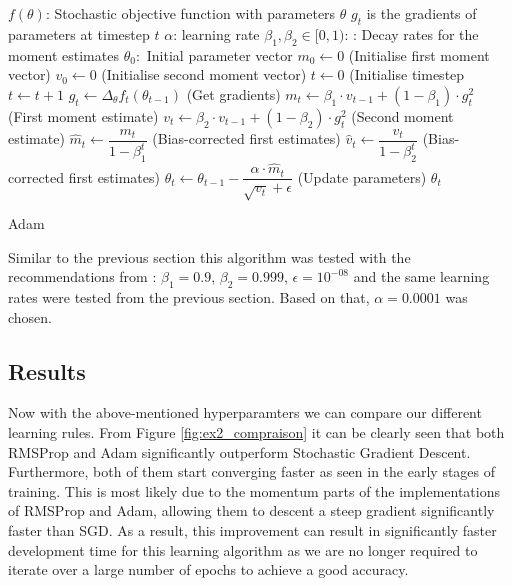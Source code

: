 \documentclass{article}
\begin{document}
\begin{algorithm}[ht]
\begin{algorithmic}
   \STATE $f(\theta)$: Stochastic objective function with parameters $\theta$ 
   \STATE $g_t$ is the gradients of parameters at timestep $t$
   \REQUIRE $\alpha$: learning rate
   \REQUIRE $\beta_1, \beta_2 \in [0,1)$: : Decay rates for the moment estimates
   \REQUIRE $\theta_0:$ Initial parameter vector
   \STATE $m_0 \gets 0$ (Initialise first moment vector)
   \STATE $v_0 \gets 0$ (Initialise second moment vector)
   \STATE $t \gets 0$ (Initialise timestep
   \STATE $t \gets t + 1$
   \STATE $g_t \gets \Delta_\theta f_t(\theta_{t-1})$ (Get gradients)
   \STATE $m_t \gets \beta_1 \cdot v_{t-1} + (1-\beta_1) \cdot g^2_t$ (First moment estimate)
   \STATE $v_t \gets \beta_2 \cdot v_{t-1} + (1-\beta_2) \cdot g^2_t$ (Second moment estimate)
   \STATE $\hat{m}_t \gets \dfrac{m_t}{1-\beta^t_1}$ (Bias-corrected first estimates)
   \STATE $\hat{v}_t \gets \dfrac{v_t}{1-\beta^t_2}$ (Bias-corrected first estimates)
   \STATE $\theta_t \gets \theta_{t-1} - \dfrac{\alpha \cdot \hat{m}_t}{\sqrt{v_t} + \epsilon}$ (Update parameters)
   \ENDWHILE
   \RETURN $\theta_t$
\end{algorithmic}
  \caption{Adam}
  \label{alg:adam}
\end{algorithm}

Similar to the previous section this algorithm was tested with the recommendations from \citep{Adam} : $\beta_1 = 0.9$, $\beta_2 = 0.999$, $\epsilon = 10^{-08}$ and the same learning rates were tested from the previous section. Based on that, $\alpha = 0.0001$ was chosen.

\subsection{Results}
Now with the above-mentioned hyperparamters we can compare our different learning rules. From Figure \ref{fig:ex2_compraison} it can be clearly seen that both RMSProp and Adam significantly outperform Stochastic Gradient Descent. Furthermore, both of them start converging faster as seen in the early stages of training. This is most likely due to the momentum parts of the implementations of RMSProp and Adam, allowing them to descent a steep gradient significantly faster than SGD. As a result, this improvement can result in significantly faster development time for this learning algorithm as we are no longer required to iterate over a large number of epochs to achieve a good accuracy.
\end{document}
